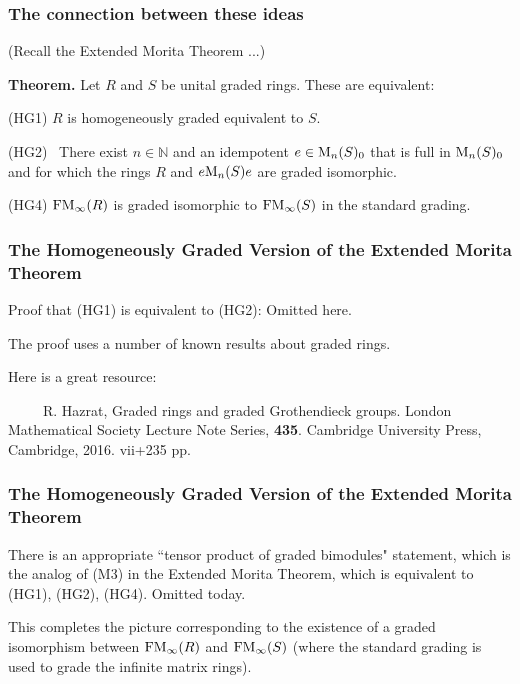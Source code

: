 \documentclass{beamer}
\newcommand{\N}{\mathbb{N}}
\begin{document}
\begin{frame}
\frametitle{The connection between these ideas}

(Recall the Extended Morita Theorem ...)


\pause

\bigskip

{\bf Theorem.}   Let $R$ and $S$ be unital graded rings.   These are equivalent:

\medskip

(HG1)   $R$ is homogeneously graded equivalent to $S$.

\medskip


(HG2) \    There exist $n\in \N$ and an idempotent $e \in {\rm M}_n(S)_0$ that is full in ${\rm M}_n(S)_0$ and for which the rings $R$ and $ e{\rm M}_n(S)e$ are graded isomorphic.

\medskip

(HG4)    ${\rm FM}_\infty(R)$ is graded isomorphic to  ${\rm FM}_\infty(S)$ in the standard grading.  

\end{frame}




\begin{frame}
\frametitle{The Homogeneously Graded Version of the Extended Morita Theorem}

Proof that (HG1) is equivalent to (HG2):   Omitted here.  

\medskip

The proof uses a number of known results about graded rings.    

\bigskip
\bigskip

Here is a great resource:


\ \ \ \ \ R. Hazrat, Graded rings and graded Grothendieck groups. London Mathematical Society Lecture Note Series, \textbf{435}. Cambridge University Press, Cambridge, 2016. vii+235 pp.




\end{frame}




\begin{frame}
\frametitle{The Homogeneously Graded Version of the Extended Morita Theorem}

There is an appropriate ``tensor product of graded bimodules" statement, which is the analog of (M3) in the Extended Morita Theorem, which is equivalent to (HG1), (HG2), (HG4).   Omitted today.   

\bigskip
\bigskip

This completes the picture corresponding to the existence of a graded isomorphism between  ${\rm FM}_\infty(R)$ and  ${\rm FM}_\infty(S)$ (where  the standard grading is used to grade the infinite matrix rings).

\end{frame}
\end{document}
